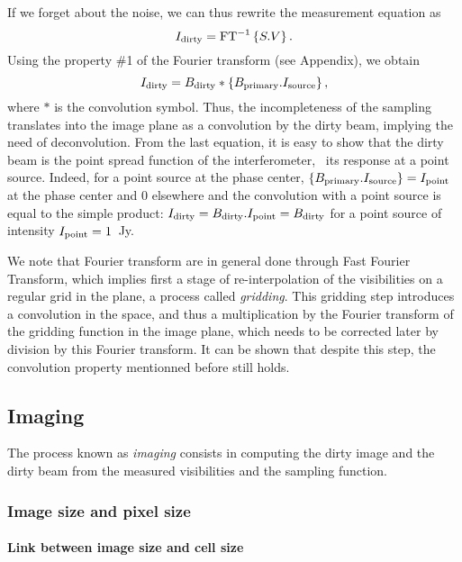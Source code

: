 If we forget about the noise, we can thus rewrite the measurement equation
as
\begin{equation}
  I_{\mathrm{dirty}} = \mbox{FT}^{-1} \displaystyle\left\{ S.V \right\}.
\end{equation}
Using the property \#1 of the Fourier transform (see Appendix), we obtain
\begin{equation}
  I_{\mathrm{dirty}} = B_{\mathrm{dirty}} \ast \displaystyle\left\{ B_{\mathrm{primary}}.I_{\mathrm{source}} \right\},
\end{equation}
where $\ast$ is the convolution symbol. Thus, the incompleteness of the
\uv{} sampling translates into the image plane as a convolution by the dirty
beam, implying the need of deconvolution. From the last equation, it is
easy to show that the dirty beam is the point spread function of the
interferometer, \ie\ its response at a point source. Indeed, for a point
source at the phase center, $\displaystyle\left\{ B_{\mathrm{primary}}.I_{\mathrm{source}} \right\} =
I_{\mathrm{point}}$ at the phase center and 0 elsewhere and the convolution with
a point source is equal to the simple product: $I_{\mathrm{dirty}} =
B_{\mathrm{dirty}}.I_{\mathrm{point}} = B_{\mathrm{dirty}}$ for a point source of
intensity $I_{\mathrm{point}} = 1$~Jy.

We note that Fourier transform are in general done through Fast Fourier 
Transform, which implies first a stage of re-interpolation of the 
visibilities on a regular grid in the \uv{} plane, a process called 
\textit{gridding}. This gridding step introduces a convolution in the 
\uv{} space, and thus a multiplication by the Fourier transform of the 
gridding function in the image plane, which needs to be corrected
later by division by this Fourier transform. It can be shown that despite this 
step, the convolution property mentionned before still holds.
 
\subsection{Imaging}

The process known as {\it imaging} consists in computing the dirty image
and the dirty beam from the measured visibilities and the sampling
function. 

\subsubsection{Image size and pixel size}


\paragraph{Link between image size and \uv{} cell size}

